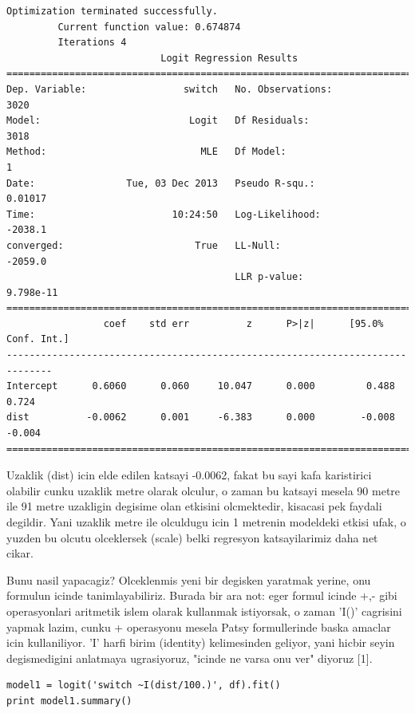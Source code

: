 \documentclass[12pt,fleqn]{article}\usepackage{../common}
\begin{document}
\begin{verbatim}
Optimization terminated successfully.
         Current function value: 0.674874
         Iterations 4
                           Logit Regression Results                           
==============================================================================
Dep. Variable:                 switch   No. Observations:                 3020
Model:                          Logit   Df Residuals:                     3018
Method:                           MLE   Df Model:                            1
Date:                Tue, 03 Dec 2013   Pseudo R-squ.:                 0.01017
Time:                        10:24:50   Log-Likelihood:                -2038.1
converged:                       True   LL-Null:                       -2059.0
                                        LLR p-value:                 9.798e-11
==============================================================================
                 coef    std err          z      P>|z|      [95.0% Conf. Int.]
------------------------------------------------------------------------------
Intercept      0.6060      0.060     10.047      0.000         0.488     0.724
dist          -0.0062      0.001     -6.383      0.000        -0.008    -0.004
==============================================================================
\end{verbatim}

Uzaklik (dist) icin elde edilen katsayi -0.0062, fakat bu sayi kafa
karistirici olabilir cunku uzaklik metre olarak olculur, o zaman bu
katsayi mesela 90 metre ile 91 metre uzakligin degisime olan etkisini
olcmektedir, kisacasi pek faydali degildir. Yani uzaklik metre ile
olculdugu icin 1 metrenin modeldeki etkisi ufak, o yuzden bu olcutu
olceklersek (scale) belki regresyon katsayilarimiz daha net
cikar.

Bunu nasil yapacagiz?  Olceklenmis yeni bir degisken yaratmak yerine,
onu formulun icinde tanimlayabiliriz.  Burada bir ara not: eger formul
icinde +,- gibi operasyonlari aritmetik islem olarak kullanmak
istiyorsak, o zaman 'I()' cagrisini yapmak lazim, cunku + operasyonu
mesela Patsy formullerinde baska amaclar icin kullaniliyor. 'I' harfi
birim (identity) kelimesinden geliyor, yani hicbir seyin degismedigini
anlatmaya ugrasiyoruz, "icinde ne varsa onu ver" diyoruz [1].

\begin{verbatim}
model1 = logit('switch ~I(dist/100.)', df).fit()
print model1.summary()
\end{verbatim}
\end{document}

